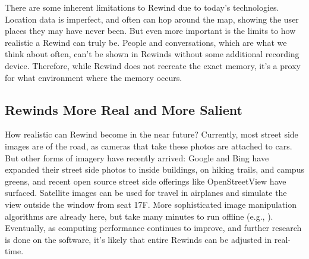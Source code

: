 \documentclass{sigchi}
\begin{document}


There are some inherent limitations to Rewind due to today's technologies. Location data is imperfect, and often can hop around the map, showing the user places they may have never been. But even more important is the limits to how realistic a Rewind can truly be. People and conversations, which are what we think about often, can't be shown in Rewinds without some additional recording device. Therefore, while Rewind does not recreate the exact memory, it's a proxy for what environment where the memory occurs.

\subsection{Rewinds More Real and More Salient}

How realistic can Rewind become in the near future? Currently, most street side images are of the road, as cameras that take these photos are attached to cars. But other forms of imagery have recently arrived: Google and Bing have expanded their street side photos to inside buildings, on hiking trails, and campus greens, and recent open source street side offerings like OpenStreetView have surfaced. Satellite images can be used for travel in airplanes and simulate the view outside the window from seat 17F. More sophisticated image manipulation algorithms are already here, but take many minutes to run offline (e.g., \cite{laffont2014transient,shih2013data}). Eventually, as computing performance continues to improve, and further research is done on the software, it's likely that entire Rewinds can be adjusted in real-time.
\end{document}
